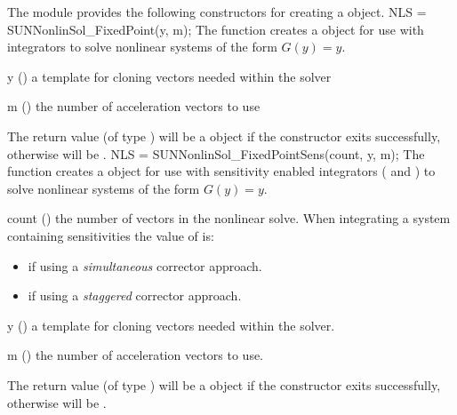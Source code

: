 The {\sunnonlinsolfixedpoint} module provides the following constructors
for creating a \newline
{} object.
{
  NLS = SUNNonlinSol\_FixedPoint(y, m);
}
{
  The function  creates a
   object for use with {\sundials} integrators to
  solve nonlinear systems of the form $G(y) = y$.
}
{
  \begin{args}[y]
  \item[y] ()
    a template for cloning vectors needed within the solver
  \item[m] ()
    the number of acceleration vectors to use
  \end{args}
}
{
  The return value  (of type ) will be
  a {\sunnonlinsol} object if the constructor exits successfully,
  otherwise  will be .
}
{}
{
  NLS = SUNNonlinSol\_FixedPointSens(count, y, m);
}
{
  The function  creates a
   object for use with {\sundials} sensitivity enabled
  integrators ({\cvodes} and {\idas}) to solve nonlinear systems of the form
  $G(y) = y$. 
}
{
  \begin{args}[count]
  \item[count] ()
    the number of vectors in the nonlinear solve. When integrating a system
    containing  sensitivities the value of  is:
    \begin{itemize}
      \item {} if using a \textit{simultaneous} corrector approach.
      \item {} if using a \textit{staggered} corrector approach.
    \end{itemize}
  \item[y] ()
    a template for cloning vectors needed within the solver.
  \item[m] ()
    the number of acceleration vectors to use.
  \end{args}
}
{
  The return value  (of type ) will be
  a {\sunnonlinsol} object if the constructor exits successfully,
  otherwise  will be .
}
{}
